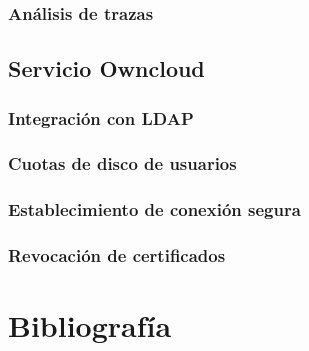 \documentclass[a4paper]{article}
\begin{document}
\subsubsection{Análisis de trazas}

\subsection{Servicio Owncloud}
\subsubsection{Integración con LDAP}
\subsubsection{Cuotas de disco de usuarios}
\subsubsection{Establecimiento de conexión segura}
\subsubsection{Revocación de certificados}


\section{Bibliografía}
\nocite{*}

\end{document}
